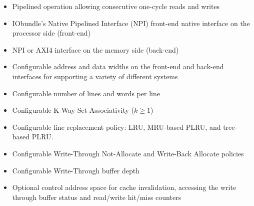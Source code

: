 \begin{itemize}
  \itemsep-0.5em
\item Pipelined operation allowing consecutive one-cycle reads and writes
\item IObundle's Native Pipelined Interface (NPI) front-end native interface on the processor side (front-end)
\item NPI or AXI4 interface on the memory side (back-end)
\item Configurable address and data widths on the front-end and back-end interfaces for supporting a variety of different systems
\item Configurable number of lines and words per line
\item Configurable K-Way Set-Associativity ($k \geq 1$)
\item Configurable line replacement policy: LRU, MRU-based PLRU, and tree-based PLRU.
\item Configurable Write-Through Not-Allocate and Write-Back Allocate policies
\item Configurable Write-Through buffer depth
\item Optional control address space for cache invalidation, accessing the write through buffer status and read/write hit/miss counters
\end{itemize}
